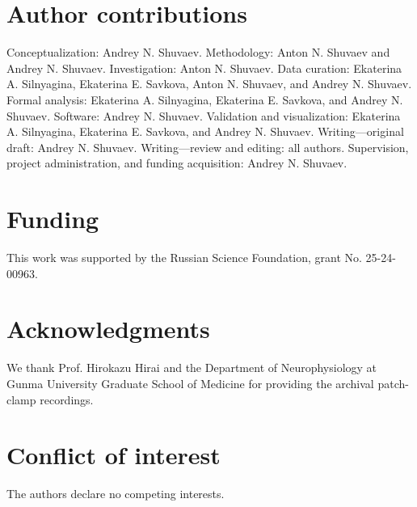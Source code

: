 \documentclass[utf8]{FrontiersinHarvard}
\begin{document}
\section*{Author contributions}
Conceptualization: Andrey N. Shuvaev. Methodology: Anton N. Shuvaev and Andrey N. Shuvaev. Investigation: Anton N. Shuvaev. Data curation: Ekaterina A. Silnyagina, Ekaterina E. Savkova, Anton N. Shuvaev, and Andrey N. Shuvaev. Formal analysis: Ekaterina A. Silnyagina, Ekaterina E. Savkova, and Andrey N. Shuvaev. Software: Andrey N. Shuvaev. Validation and visualization: Ekaterina A. Silnyagina, Ekaterina E. Savkova, and Andrey N. Shuvaev. Writing---original draft: Andrey N. Shuvaev. Writing---review and editing: all authors. Supervision, project administration, and funding acquisition: Andrey N. Shuvaev.
\section*{Funding}
This work was supported by the Russian Science Foundation, grant No. 25-24-00963.
\section*{Acknowledgments}
We thank Prof. Hirokazu Hirai and the Department of Neurophysiology at Gunma University Graduate School of Medicine for providing the archival patch-clamp recordings.
\section*{Conflict of interest}
The authors declare no competing interests.

\clearpage

\end{document}
